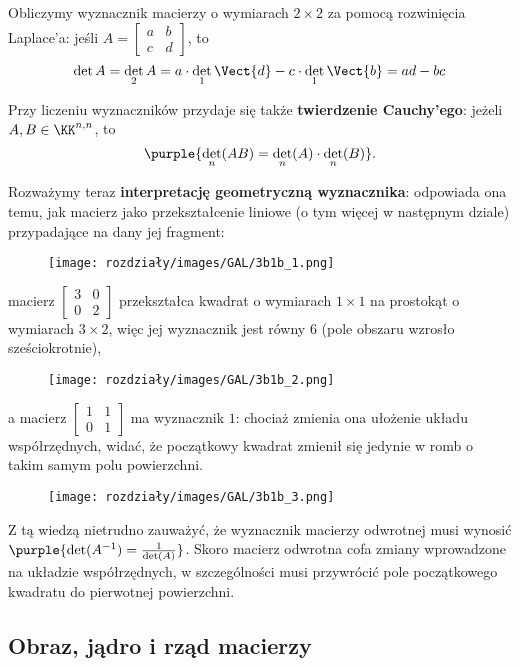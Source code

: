 \begin{example}
    Obliczymy wyznacznik macierzy o wymiarach $2 \times 2$ za pomocą rozwinięcia Laplace'a: jeśli $A = \begin{bmatrix}
        a & b \\ c & d
    \end{bmatrix}$, to
    $$\det A = \det_2 A = a \cdot \det_1 \Vect{d} - c \cdot \det_1 \Vect{b} = ad - bc$$
\end{example}

Przy liczeniu wyznaczników przydaje się także \textbf{twierdzenie Cauchy'ego}: jeżeli $A,B\in \KK^{n,n}$, to 
$$
\purple{\det_n(AB)=\det_n(A)\cdot \det_n(B)}.
$$

Rozważymy teraz \textbf{interpretację geometryczną wyznacznika}: odpowiada ona temu, jak macierz jako przekształcenie liniowe (o tym więcej w następnym dziale)  przypadające na dany jej fragment:
\begin{figure}[H]
    \centering
    \texttt{[image: rozdziały/images/GAL/3b1b\_1.png]}
\end{figure}
macierz $\begin{bmatrix}
    3 & 0 \\ 0 & 2
\end{bmatrix}$ przekształca kwadrat o wymiarach $1\times 1$ na prostokąt o wymiarach $3\times 2$, więc jej wyznacznik jest równy 6 (pole obszaru wzrosło sześciokrotnie),
\begin{figure}[H]
    \centering
    \texttt{[image: rozdziały/images/GAL/3b1b\_2.png]}
\end{figure}
a macierz $\begin{bmatrix}
    1 & 1 \\ 0 & 1
\end{bmatrix}$ ma wyznacznik $1$: chociaż zmienia ona ułożenie układu współrzędnych, widać, że początkowy kwadrat zmienił się jedynie w romb o takim samym polu powierzchni.
\begin{figure}[H]
    \centering
    \texttt{[image: rozdziały/images/GAL/3b1b\_3.png]}
\end{figure}
Z tą wiedzą nietrudno zauważyć, że wyznacznik macierzy odwrotnej musi wynosić $\purple{\det(A^{-1})=\frac{1}{\det(A)}}$. Skoro macierz odwrotna cofa zmiany wprowadzone na układzie współrzędnych, w szczególności musi przywrócić pole początkowego kwadratu do pierwotnej powierzchni.

\subsection{Obraz, jądro i rząd macierzy}

